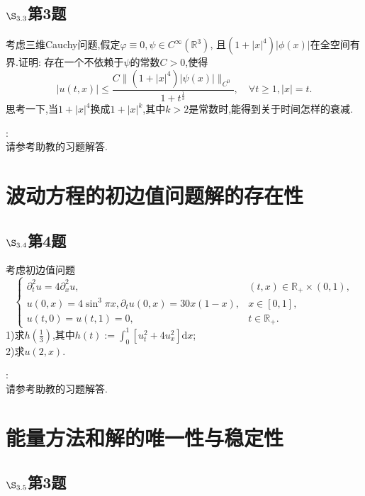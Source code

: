 \documentclass[12pt, a4paper]{ctexbook}
\newcommand{\dx}{\text{d}x}
\begin{document}
    
    
    \subsection{$\S_{3.3}$第3题}
    \kaishu{}
    
    考虑三维Cauchy问题,假定$\varphi \equiv 0 , \psi\in C^\infty(\mathbb R^3)$,
    且$(1+|x|^4)|\phi(x)|$在全空间有界.证明: 存在一个不依赖于$\psi$的常数$C>0$,使得
    $$|u(t,x)| \leq \frac{C\|(1+|x|^4)|\psi(x)|\|_{C^0}}{1+t^{\frac13}}, \quad \forall t \geq 1, |x|=t.$$
    思考一下,当$1+|x|^4$换成$1+|x|^k$,其中$k>2$是常数时,能得到关于时间怎样的衰减.
    
    \songti{}:\\
    
    请参考助教的习题解答.
    
    \section{波动方程的初边值问题解的存在性}
    
    
    
    \subsection{$\S_{3.4}$第4题}
    \kaishu{}
    
    考虑初边值问题
    $$\begin{cases}
    \partial_t^2 u = 4\partial_x^2 u, & (t, x) \in \mathbb R_+ \times (0, 1),\\
    u(0, x) = 4\sin^3\pi x, \partial_t u(0, x) = 30x(1-x), & x\in [0, 1],\\
    u(t, 0) = u(t, 1) = 0, & t\in \mathbb R_+.
    \end{cases}$$
    1)求$h(\frac13)$,其中$h(t):= \int_0^1 [u_t^2 + 4u_x^2]\dx$;\\
    2)求$u(2,x)$.
    
    
    \songti{}:\\
    
    请参考助教的习题解答.
    
    \section{能量方法和解的唯一性与稳定性}
    
    
    
    
    \subsection{$\S_{3.5}$第3题}
    \kaishu{}
    
\end{document}
